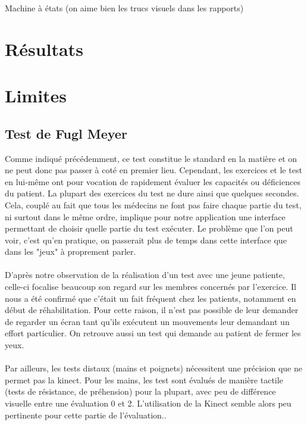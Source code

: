 \documentclass[french,12pt]{report}
\begin{document}
		Machine à états (on aime bien les trucs visuels dans les rapports)
		
		\section{Résultats}\label{resultats} %
		
		\section{Limites} \label{limites}%
			\subsection{Test de Fugl Meyer}
Comme indiqué précédemment, ce test constitue le standard en la matière et on ne peut donc pas passer à coté en premier lieu.
Cependant, les exercices et le test en lui-même ont pour vocation de rapidement évaluer les capacités ou déficiences
du patient. La plupart des exercices du test ne dure ainsi que quelques secondes. Cela, couplé au fait que tous les 
médecins ne font pas faire chaque partie du test, ni surtout dans le même ordre, implique pour notre application une interface permettant de choisir quelle partie du test exécuter. Le problème que l’on peut voir, c'est qu'en pratique, on passerait 
plus de temps dans cette interface que dans les "jeux" à proprement parler.

\paragraph{}
D'après notre observation de la réalisation d'un test avec une jeune patiente, celle-ci focalise 
beaucoup son regard sur les membres concernés par l'exercice. Il nous a été confirmé que c'était un fait fréquent
chez les patients, notamment en début de réhabilitation. Pour cette raison, il n'est pas possible de leur
demander de regarder un écran tant qu'ils exécutent un mouvements leur demandant un effort particulier.
On retrouve aussi un test qui demande au patient de fermer les yeux.

\paragraph{}
Par ailleurs, les tests distaux (mains et poignets) nécessitent une précision que ne permet pas la kinect.
Pour les mains, les test sont évalués de manière tactile (tests de résistance, de préhension) pour la plupart, 
avec peu de différence visuelle entre une évaluation 0 et 2. L’utilisation de la Kinect semble alors 
peu pertinente pour cette partie de l’évaluation..
\end{document}
